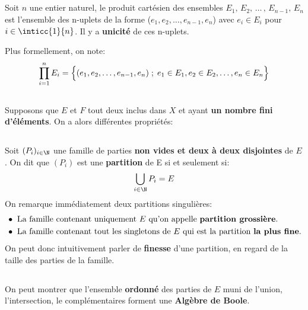 \subsection*{}
Soit \(n\) une entier naturel, le produit cartésien des ensembles \(E_1,\, E_2,\, \ldots\,,\, E_{n-1},\, E_n\) est l'ensemble des n-uplets de la forme (\(e_1, e_2, \ldots, e_{n-1}, e_n\)) avec \(e_i \in E_i\) pour \(i \in \inticc{1}{n}\).
Il y a \textbf{unicité} de ces n-uplets.

Plus formellement, on note:
\[
     \prod_{i=1}^{n} E_i = \Bigl\{ (e_1, e_2, \ldots, e_{n-1}, e_n) \; ; \; e_1 \in E_1, e_2 \in E_2, \ldots,  e_n \in E_n \Bigl\}
\]
\pagebreak
\subsection*{}
Supposons que \(E\) et \(F\) tout deux inclus dans \(X\) et ayant \textbf{un nombre fini d'éléments}. On a alors différentes propriétés:

\subsection*{}
Soit \((P_i)_{i \in \N}\) une famille de parties \textbf{non vides et deux à deux disjointes} de \(E\).\+
On dit que \((P_i)\) est une \textbf{partition} de E si et seulement si:
\[
    \bigcup_{i \in \N} P_i = E
\]
On remarque immédiatement deux partitions singulières:
\begin{align*}
    &\bullet \text{ La famille contenant uniquement } E \text{ qu'on appelle \textbf{partition grossière}.} \\
    &\bullet \text{ La famille contenant tout les singletons de } E \text{ qui est la partition \textbf{la plus fine}.}
\end{align*}
On peut donc intuitivement parler de \textbf{finesse} d'une partition, en regard de la taille des parties de la famille.

\subsection*{}
On peut montrer que l'ensemble \textbf{ordonné} des parties de \(E\) muni de l'union, l'intersection, le complémentaires forment une \textbf{Algèbre de Boole}.\<

